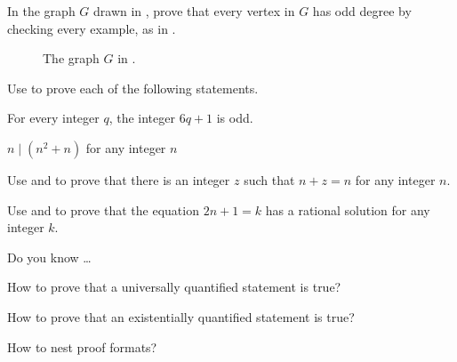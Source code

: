 \begin{exer}[\exerP] %
\label{exer_all_odd_degree}
    In the graph $G$ drawn in , prove that every vertex in $G$ has odd degree by checking every example, as in .

    \begin{figure}[hbtp]
        \centering
        
        \caption{The graph $G$ in  .}
        \label{fig_all_odd_degree}
    \end{figure}
\end{exer}

\begin{exer}[\exerP] %
\label{exer_easy_proofs_forall}
    Use  to prove each of the following statements.  
        \begin{exerpart}
            \item For every integer $q$, the integer $6q+1$ is odd.
            \item $n \mid (n^2+n)$ for any integer $n$         
        \end{exerpart}
\end{exer}

\begin{exer}[\exerU] %
\label{exer_proof_exists_forall}
Use  and  to prove that there is an integer $z$ such that $n+z=n$ for any integer $n$.   
\end{exer}

\begin{exer}[\exerU] %
\label{exer_rational_soln}   
Use  and  to prove that the equation $2n+1=k$ has a rational solution for any integer $k$. 
\end{exer}

\begin{exer}[\exerR] %
\label{exer_dyk_pff_quants}
    Do you know \ldots
        \begin{exerpart}
            \item How to prove that a universally quantified statement is true?
            \item How to prove that an existentially quantified statement is true?
            \item How to nest proof formats?
        \end{exerpart}
\end{exer}


